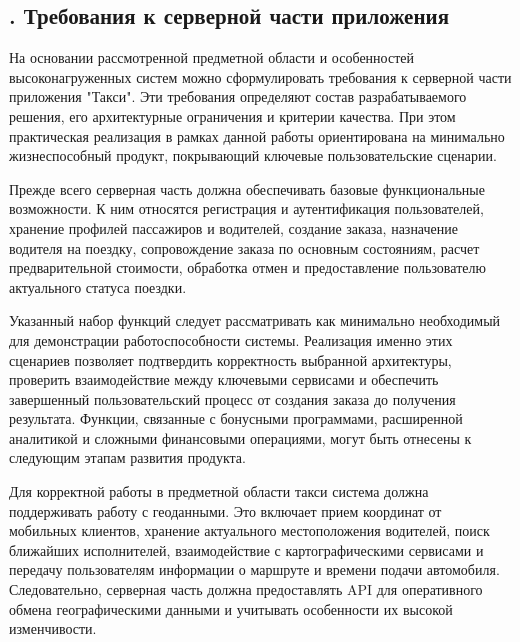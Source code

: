 	\subtitlespace
	
	\subsection*{
		\gostTitleFont
		\redline
		\thechaptercntr .\thesubchaptercntr \spc
		Требования к серверной части приложения
	} \addtocounter{subchaptercntr}{1}
	
	\subtitlespace
	
	{\gostFont
		
		\par \redline На основании рассмотренной предметной области и особенностей высоконагруженных систем можно сформулировать требования к серверной части приложения "Такси"{}. Эти требования определяют состав разрабатываемого решения, его архитектурные ограничения и критерии качества. При этом практическая реализация в рамках данной работы ориентирована на минимально жизнеспособный продукт, покрывающий ключевые пользовательские сценарии.
		
\par \redline Прежде всего серверная часть должна обеспечивать базовые функциональные возможности. К ним относятся регистрация и аутентификация пользователей, хранение профилей пассажиров и водителей, создание заказа, назначение водителя на поездку, сопровождение заказа по основным состояниям, расчет предварительной стоимости, обработка отмен и предоставление пользователю актуального статуса поездки.

\par \redline Указанный набор функций следует рассматривать как минимально необходимый для демонстрации работоспособности системы. Реализация именно этих сценариев позволяет подтвердить корректность выбранной архитектуры, проверить взаимодействие между ключевыми сервисами и обеспечить завершенный пользовательский процесс от создания заказа до получения результата. Функции, связанные с бонусными программами, расширенной аналитикой и сложными финансовыми операциями, могут быть отнесены к следующим этапам развития продукта.

\par \redline Для корректной работы в предметной области такси система должна поддерживать работу с геоданными. Это включает прием координат от мобильных клиентов, хранение актуального местоположения водителей, поиск ближайших исполнителей, взаимодействие с картографическими сервисами и передачу пользователям информации о маршруте и времени подачи автомобиля. Следовательно, серверная часть должна предоставлять API для оперативного обмена географическими данными и учитывать особенности их высокой изменчивости.

}

